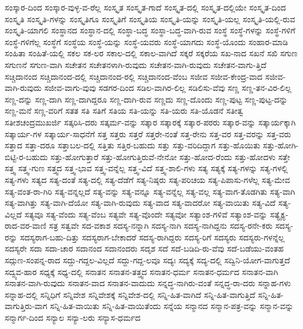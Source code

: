 {ಸಂಸ್ಕಾರ-ದಿಂದ
ಸಂಸ್ಕಾರ-ವುಳ್ಳ-ವ-ರೆಲ್ಲ
ಸಂಸ್ಕೃತ
ಸಂಸ್ಕೃತ-ಗಾದೆ
ಸಂಸ್ಕೃತ-ದಲ್ಲಿ
ಸಂಸ್ಕೃತ-ದಲ್ಲಿಯೇ
ಸಂಸ್ಕೃತ-ದಿಂದ
ಸಂಸ್ಕೃತಿ
ಸಂಸ್ಕೃತಿ-ಗಳನ್ನು
ಸಂಸ್ಕೃತಿಗೂ
ಸಂಸ್ಕೃತಿಗೆ
ಸಂಸ್ಕೃತಿಯ
ಸಂಸ್ಕೃತಿ-ಯನ್ನು
ಸಂಸ್ಕೃತಿ-ಯಲ್ಲ
ಸಂಸ್ಕೃತಿ-ಯಲ್ಲಿ-ರುವ
ಸಂಸ್ಕೃತಿ-ಯಾಗಲಿ
ಸಂಸ್ಥಾನದ
ಸಂಸ್ಥಾನ-ದಲ್ಲಿ
ಸಂಸ್ಥಾ-ಬದ್ಧ
ಸಂಸ್ಥಾ-ಬದ್ಧ-ವಾಗಿ-ರುವ
ಸಂಸ್ಥೆ
ಸಂಸ್ಥೆ-ಗಳನ್ನು
ಸಂಸ್ಥೆ-ಗಳಿಗೆ
ಸಂಸ್ಥೆ-ಗಳಿಗೆಲ್ಲ
ಸಂಸ್ಥೆಗೆ
ಸಂಸ್ಥೆಯ
ಸಂಸ್ಥೆ-ಯನ್ನು
ಸಂಸ್ಥೆ-ಯವರು
ಸಂಸ್ಥೆ-ಯಾಗದು
ಸಂಸ್ಥೆ-ಯೊಂದು
ಸಂಹಾರ-ಮಾಡಿ
ಸಂಹಿತಾ
ಸಂಹಿತೆ-ಯಲ್ಲಿ
ಸಕಲ
ಸಕ-ಲರ
ಸಕಾಲ-ದಲ್ಲಿ
ಸಕಾಲ-ವಾಗಿದೆ
ಸಕ್ಕರೆ
ಸಕ್ಕರೆಯ
ಸಖ-ನಾದ
ಸಖನೆ
ಸಖಿ
ಸಗುಣ
ಸಗುಣನೆ
ಸಗುಣ-ವಾಗಿ
ಸಚೇತನ
ಸಚೇತನಳಾಗಿ-ರುವುದು
ಸಚೇತನ-ವಾಗಿ-ರುವುದು
ಸಚೇತನ-ವಾಗು-ತ್ತಿದೆ
ಸಚ್ಚಿದಾನಂದ
ಸಚ್ಚಿದಾನಂದ-ದಲ್ಲಿ
ಸಚ್ಚಿದಾನಂದ-ರಲ್ಲಿ
ಸಚ್ಚಿದಾನಂದ-ವೆಂಬ
ಸಜೀವ
ಸಜೀವ-ಕೇಂದ್ರ-ವಾದ
ಸಜೀವ-ವಾಗಿ-ರುವುದು
ಸಜೀವ-ವಾಗು-ವುವು
ಸಡಗರ-ದಿಂದ
ಸಡಿಲ-ವಾಗಿರ-ಲಿಲ್ಲ
ಸಡಿಲಿಸು-ವೆವು
ಸಣ್ಣ
ಸಣ್ಣ-ತನ-ವಿರ-ಲಿಲ್ಲ
ಸಣ್ಣ-ದನ್ನು
ಸಣ್ಣ-ದಾಗಿ
ಸಣ್ಣ-ದಾಗಿದ್ದರೂ
ಸಣ್ಣ-ದಾಗಿ-ರುವ
ಸಣ್ಣದು
ಸಣ್ಣ-ದೊಂದು
ಸಣ್ಣ-ಪುಟ್ಟ
ಸಣ್ಣ-ಪುಟ್ಟ-ದನ್ನು
ಸಣ್ಣ-ಮನೆ
ಸಣ್ಣ-ವರಿಗೆ
ಸತತ
ಸತಿ
ಸತಿಗೆ
ಸತಿಯ
ಸತಿ-ಯನ್ನು
ಸತಿ-ಯರು
ಸತಿ-ಯೊಡನೆ
ಸತೀತ್ವ
ಸತೀಶಚಂದ್ರಮುಖರ್ಜಿ
ಸತ್ಕರಿಸಿ-ದರು
ಸತ್ಕರ್ಮ-ವನ್ನು
ಸತ್ಕಾರ
ಸತ್ಕಾರಕ್ಕೆ
ಸತ್ಕಾರ-ಪರರು
ಸತ್ಕಾರ-ವನ್ನು
ಸತ್ಕಾರ್ಯಕ್ಕಾಗಿ
ಸತ್ಕಾರ್ಯ-ಗಳ
ಸತ್ಕಾರ್ಯ-ಸಾಧನೆಗೆ
ಸತ್ತ
ಸತ್ತರು
ಸತ್ತರೆ
ಸತ್ತರೇ-ನಂತೆ
ಸತ್ತ-ರೇನು
ಸತ್ತ-ವರ
ಸತ್ತ-ವರನ್ನು
ಸತ್ತ-ವರು
ಸತ್ತಾದ
ಸತ್ತಾ-ದರೂ
ಸತ್ತಾಬಲ-ದಲ್ಲಿ
ಸತ್ತಿತು
ಸತ್ತಿರ-ಬಹುದು
ಸತ್ತು
ಸತ್ತು-ವರಿದಿದ್ದಾಗ
ಸತ್ತು-ಹೊಯಿತು
ಸತ್ತು-ಹೋಗಿ-ಬಿಟ್ಟಿ-ರ-ಬಹುದು
ಸತ್ತು-ಹೋಗುತ್ತಾರೆ
ಸತ್ತು-ಹೋಗುತ್ತಿರುವೆ-ನೇನೋ
ಸತ್ತು-ಹೋದ-ರೆಂದು
ಸತ್ತು-ಹೋದಳು
ಸತ್ತೇ
ಸತ್ತ್ವ
ಸತ್ತ್ವ-ಗುಣ
ಸತ್ತ್ವದ
ಸತ್ತ್ವ-ಭಾವ
ಸತ್ತ್ವ-ವನ್ನೆಲ್ಲ
ಸತ್ತ್ವ-ವಿದೆ
ಸತ್ತ್ವ-ಶಾಲಿ-ಗಳು
ಸತ್ಯ
ಸತ್ಯಕ್ಕೆ
ಸತ್ಯ-ಗಳನ್ನು
ಸತ್ಯ-ಗಳಲ್ಲಿ
ಸತ್ಯ-ಗಳು
ಸತ್ಯದ
ಸತ್ಯ-ದಂತೆ
ಸತ್ಯ-ದಲ್ಲಿ
ಸತ್ಯ-ದೆಡೆಗೆ
ಸತ್ಯ-ನಿಷ್ಠರು
ಸತ್ಯ-ಪರಿಚಯ
ಸತ್ಯ-ಪಿಪಾಸು-ಗಳೆಲ್ಲ
ಸತ್ಯ-ಮೇವ
ಸತ್ಯ-ವಂತ-ರಾ-ಗಿರಿ
ಸತ್ಯ-ವನ್ನಲ್ಲದೆ
ಸತ್ಯ-ವನ್ನು
ಸತ್ಯ-ವನ್ನೂ
ಸತ್ಯ-ವನ್ನೆಲ್ಲ
ಸತ್ಯ-ವಲ್ಲ
ಸತ್ಯ-ವಾಗ-ತೊಡಗಿತು
ಸತ್ಯ-ವಾಗಿ
ಸತ್ಯ-ವಾಗಿತ್ತು
ಸತ್ಯ-ವಾಗಿ-ದೆಯೋ
ಸತ್ಯ-ವಾಗಿ-ರುವುದು
ಸತ್ಯ-ವಾದ
ಸತ್ಯ-ವಾದರೋ
ಸತ್ಯ-ವಾಯಿತು
ಸತ್ಯ-ವಿದೆ
ಸತ್ಯ-ವಿಲ್ಲದೆ
ಸತ್ಯವೂ
ಸತ್ಯ-ವೆಂದು
ಸತ್ಯ-ವೆಂಬ
ಸತ್ಯವೇ
ಸತ್ಯ-ವೊಂದೇ
ಸತ್ಯವೋ
ಸತ್ಯಾಂಶ-ಗಳಿವೆ
ಸತ್ಯಾಂಶ-ವನ್ನು
ಸತ್ಯೈಕ್ಯ-ರಾದ-ವರ-ವಾಣಿ
ಸತ್ರ
ಸತ್ವವೇ
ಸದ-ವಕಾಶ
ಸದಸ್ಯ-ನನ್ನಾಗಿ
ಸದಸ್ಯ-ನಾಗಿ
ಸದಸ್ಯ-ನಾಗಿದ್ದನು
ಸದಸ್ಯ-ರನೇ-ಕರು
ಸದಸ್ಯ-ರನ್ನು
ಸದಸ್ಯರಾಗ-ಬಹು-ದಿತ್ತು
ಸದಸ್ಯರಾಗ-ಬೇಕಾದರೆ
ಸದಸ್ಯ-ರಾಗಿದ್ದರು
ಸದಸ್ಯ-ರಿಗೆ
ಸದಸ್ಯರು
ಸದಸ್ಯರು-ಗಳನ್ನೆಲ್ಲ
ಸದಸ್ಯರೇ
ಸದಾ
ಸದಾ-ಚಾರ
ಸದಾನಂದ
ಸದಾನಂದರು
ಸದೃಶ
ಸದೆ
ಸದೆ-ಬಡಿದಿ-ರು-ವೆವು
ಸದೆ-ಬಡೆಯು-ವಂತಹ
ಸದ್ಗುಣ-ಸಂಪನ್ನ-ರಾದ
ಸದ್ದು-ಗದ್ದಲ-ವಿಲ್ಲದೆ
ಸದ್ದು-ಗದ್ದ-ಲವೂ
ಸದ್ಯಃ
ಸದ್ಯಕ್ಕೆ
ಸದ್ಯ-ದಲ್ಲಿ
ಸದ್ವಿನಿ-ಯೋಗ-ವಾಗುತ್ತದೆ
ಸದ್ವ್ಯವ-ಹಾರ
ಸಧ್ಯಕ್ಕೆ
ಸಧ್ಯ-ದಲ್ಲಿ
ಸನಾತನ
ಸನಾತನ-ತತ್ತ್ವದ
ಸನಾತನ-ಧರ್ಮ
ಸನಾತನ-ಧರ್ಮದ
ಸನಾತನ-ವಾಗಿ
ಸನಾತನ-ವಾಗಿ-ರುವುದು
ಸನಾತನ-ವಾದ
ಸನಾತನ-ವಾದುದು
ಸನ್ನದ್ಧ-ನಾಗಿರು-ವಂತೆ
ಸನ್ನದ್ಧ-ರಾ-ದರು
ಸನ್ನಾಹ-ಗಳು
ಸನ್ನಾಹ-ದಲ್ಲಿ
ಸನ್ನಿಧಿಗೆ
ಸನ್ನಿವೇಶ
ಸನ್ನಿವೇಶಕ್ಕೆ
ಸನ್ನಿವೇಶ-ದಲ್ಲಿ
ಸನ್ನಿ-ಹಿತ-ವಾಗಿದೆ
ಸನ್ನಿ-ಹಿತ-ವಾಗುತ್ತಿದೆ
ಸನ್ನಿ-ಹಿತ-ವಾಗುತ್ತಿರು-ವಾಗ
ಸನ್ನಿ-ಹಿತ-ವಾಯಿತು
ಸನ್ನಿ-ಹಿತ-ವಾಯಿತೆಂದು
ಸನ್ನೆಯ
ಸನ್ಮಾನದ
ಸನ್ಮಾನ-ಪತ್ರ-ವನ್ನು
ಸನ್ಮಾನ-ವನ್ನು
ಸನ್ಮಾರ್ಗ-ದಿಂದ
ಸನ್ಯಾಲ
ಸನ್ಯಾ-ಲರು
ಸನ್ಯಾಸ-ಧರ್ಮದ
}
